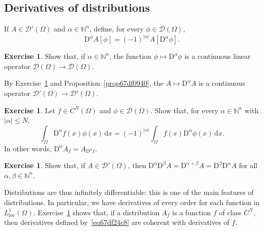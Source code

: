 \documentclass[a4paper,9pt]{amsart}
\newcommand{\scr}[1]{\mathscr{#1}}
\newcommand{\N}{\mathbb{N}}	%
\newcommand{\did}{\,\mathrm{d}}	%
\newcommand{\Diff}{\mathrm{D}}
\newcommand{\loc}{\mathrm{loc}}
\theoremstyle{plain}
\theoremstyle{definition}
\newtheorem{exercise}[proposition]{Exercise}%
\theoremstyle{remark}
\begin{document}
\subsection{Derivatives of distributions}\label{subs67df096d}
If $A\in\scr D'(\Omega)$ and $\alpha\in\N^n$, define, for every $\phi\in\scr D(\Omega)$,
\begin{equation}\label{eq67df24c8}
	\Diff^\alpha A[\phi] = (-1)^{|\alpha|} A[\Diff^\alpha \phi] .
\end{equation}

\begin{exercise}\label{ex67df0a00}
	Show that, if $\alpha\in\N^n$, the function $\phi\mapsto \Diff^\alpha\phi$ is a continuous linear operator $\scr D(\Omega)\to\scr D(\Omega)$.
\end{exercise}

By Exercise~\ref{ex67df0a00} and Proposition~\ref{prop67df0940},
the $A\mapsto \Diff^\alpha A$ is a continuous operator $\scr D'(\Omega)\to\scr D'(\Omega)$.

\begin{exercise}\label{ex67df246e}
	Let $f\in C^N(\Omega)$ and $\phi\in\scr D(\Omega)$.
	Show that, for every $\alpha\in\N^n$ with $|\alpha|\le N$,
	\begin{equation}
		\int_\Omega \Diff^\alpha f(x) \phi(x) \did x 
		= (-1)^{|\alpha|} \int_\Omega f(x) \Diff^\alpha \phi(x) \did x .
	\end{equation}
	In other words, $\Diff^\alpha A_f = A_{\Diff^\alpha f}$.
\end{exercise}

\begin{exercise}
	Show that, if $A\in\scr D'(\Omega)$, then $\Diff^\alpha\Diff^\beta A = \Diff^{\alpha+\beta}A = \Diff^\beta\Diff^\alpha A$ for all $\alpha,\beta\in\N^n$.
\end{exercise}

Distributions are thus infinitely differentiable: this is one of the main features of distributions.
In particular, we have derivatives of every order for each function in $L^1_\loc(\Omega)$.
Exercise~\ref{ex67df246e} shows that, if a distribution $A_f$ is a function $f$ of class $C^N$, then derivatives defined by~\eqref{eq67df24c8} are coherent with derivatives of $f$.
\end{document}
